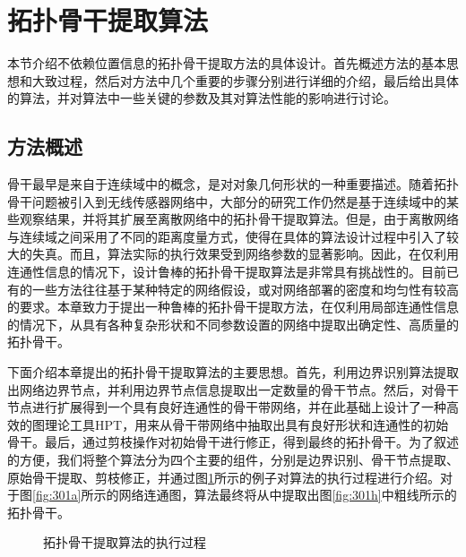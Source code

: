 \section{拓扑骨干提取算法}
本节介绍不依赖位置信息的拓扑骨干提取方法的具体设计。首先概述方法的基本思想和大致过程，然后对方法中几个重要的步骤分别进行详细的介绍，最后给出具体的算法，并对算法中一些关键的参数及其对算法性能的影响进行讨论。
\subsection{方法概述}
骨干最早是来自于连续域中的概念，是对对象几何形状的一种重要描述。随着拓扑骨干问题被引入到无线传感器网络中，大部分的研究工作仍然是基于连续域中的某些观察结果，并将其扩展至离散网络中的拓扑骨干提取算法。但是，由于离散网络与连续域之间采用了不同的距离度量方式，使得在具体的算法设计过程中引入了较大的失真。而且，算法实际的执行效果受到网络参数的显著影响。因此，在仅利用连通性信息的情况下，设计鲁棒的拓扑骨干提取算法是非常具有挑战性的。目前已有的一些方法往往基于某种特定的网络假设，或对网络部署的密度和均匀性有较高的要求。本章致力于提出一种鲁棒的拓扑骨干提取方法，在仅利用局部连通性信息的情况下，从具有各种复杂形状和不同参数设置的网络中提取出确定性、高质量的拓扑骨干。

下面介绍本章提出的拓扑骨干提取算法的主要思想。首先，利用边界识别算法提取出网络边界节点，并利用边界节点信息提取出一定数量的骨干节点。然后，对骨干节点进行扩展得到一个具有良好连通性的骨干带网络，并在此基础上设计了一种高效的图理论工具HPT，用来从骨干带网络中抽取出具有良好形状和连通性的初始骨干。最后，通过剪枝操作对初始骨干进行修正，得到最终的拓扑骨干。为了叙述的方便，我们将整个算法分为四个主要的组件，分别是边界识别、骨干节点提取、原始骨干提取、剪枝修正，并通过图\ref{fig:301}所示的例子对算法的执行过程进行介绍。对于图\ref{fig:301a}所示的网络连通图，算法最终将从中提取出图\ref{fig:301h}中粗线所示的拓扑骨干。
\begin{figure}[t]
  \centering
  \hspace{0.25em}%
  \hspace{0.25em}%
  \hspace{0.25em}%
  \hspace{0.25em}%
  \hspace{0.25em}%
  \hspace{0.25em}%
  \hspace{0.25em}%
  \caption{拓扑骨干提取算法的执行过程}
  \label{fig:301}
\end{figure}

